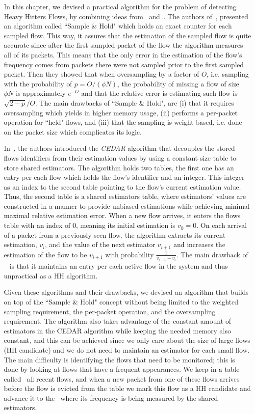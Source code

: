 In this chapter, we devised a practical algorithm for the problem of detecting Heavy Hitters Flows, by combining ideas from~\cite{sampleAndHold} and~\cite{CEDAR}. The authors of~\cite{sampleAndHold}, presented an algorithm called ``Sample \& Hold" which holds an exact counter for each sampled flow. This way, it assures that the estimation of the sampled flow is quite accurate since after the first sampled packet of the flow the algorithm measures all of its packets. This means that the only error in the estimation of the flow's frequency comes from packets there were not sampled prior to the first sampled packet. Then they showed that when oversampling by a factor of $O$, i.e. sampling with the probability of $p=O/(\phi N)$, the probability of missing a flow of size $\phi N$ is approximately $e^{-O}$ and that the relative error is estimating such flow is $\sqrt{2-p}/O$. The main drawbacks of ``Sample \& Hold", are (i) that it requires oversampling which yields in higher memory usage, (ii) performs a per-packet operation for ``held" flows, and (iii) that the sampling is weight based, i.e. done on the packet size which complicates its logic.

In~\cite{CEDAR}, the authors introduced the \textit{CEDAR} algorithm that decouples the stored flows identifiers from their estimation values by using a constant size table to store shared estimators. The algorithm holds two tables, the first one has an entry per each flow which holds the flow's identifier and an integer. This integer as an index to the second table pointing to the flow's current estimation value. Thus, the second table is a shared estimators table, where estimators' values are constructed in a manner to provide unbiased estimations while achieving minimal maximal relative estimation error. When a new flow arrives, it enters the flows table with an index of $0$, meaning its initial estimation is $v_0=0$. On each arrival of a packet from a previously seen flow, the algorithm extracts its current estimation, $v_i$, and the value of the next estimator $v_{i+1}$ and increases the estimation of the flow to be $v_{i+1}$ with probability $\frac{1}{v_{i+1}-v_{i}}$. The main drawback of ~\cite{CEDAR} is that it maintains an entry per each active flow in the system and thus unpractical as a HH algorithm.

Given these algorithms and their drawbacks, we devised an algorithm that builds on top of the ``Sample \& Hold" concept without being limited to the weighted sampling requirement, the per-packet operation, and the oversampling requirement. The algorithm also takes advantage of the constant amount of estimators in the CEDAR algorithm while keeping the needed memory also constant, and this can be achieved since we only care about the size of large flows (HH candidate) and we do not need to maintain an estimator for each small flow. The main difficulty is identifying the flows that need to be monitored; this is done by looking at flows that have a frequent appearances. We keep in a table called \sfa\ all recent flows, and when a new packet from one of these flows arrives before the flow is evicted from the table we mark this flow as a HH candidate and advance it to the \cs\ where its frequency is being measured by the shared estimators. 

